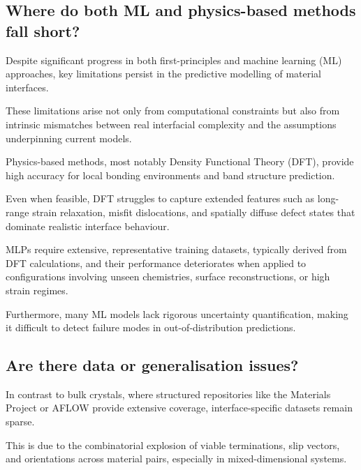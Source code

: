 
\subsection{Where do both ML and physics-based methods fall short?}


Despite significant progress in both first-principles and machine learning (ML) approaches, key limitations persist in
the predictive modelling of material interfaces.

These limitations arise not only from computational constraints but also from intrinsic mismatches between real
interfacial complexity and the assumptions underpinning current models.


Physics-based methods, most notably Density Functional Theory (DFT), provide high accuracy for local bonding
environments and band structure prediction.

Even when feasible, DFT struggles to capture extended features such as long-range strain relaxation, misfit
dislocations, and spatially diffuse defect states that dominate realistic interface behaviour.


MLPs require extensive, representative training datasets, typically derived from DFT calculations, and their performance
deteriorates when applied to configurations involving unseen chemistries, surface reconstructions, or high strain
regimes.

Furthermore, many ML models lack rigorous uncertainty quantification, making it difficult to detect failure modes in
out-of-distribution predictions.


\subsection{Are there data or generalisation issues?}


In contrast to bulk crystals, where structured repositories like the Materials Project or AFLOW provide extensive
coverage, interface-specific datasets remain sparse.

This is due to the combinatorial explosion of viable terminations, slip vectors, and orientations across material pairs,
especially in mixed-dimensional systems.

